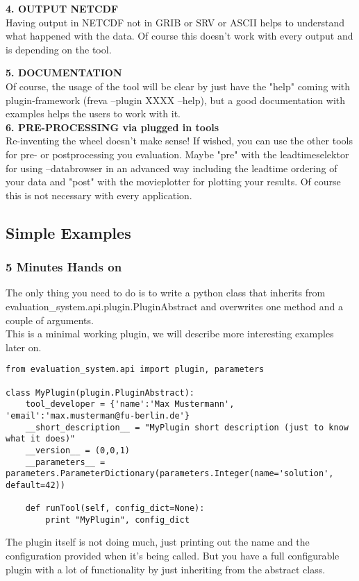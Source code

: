 \documentclass[a4paper,11pt]{ltxdoc}
\begin{document}
\textbf{4. OUTPUT NETCDF}\\
Having output in NETCDF not in GRIB or SRV or ASCII helps to understand what happened with the data. Of course this doesn't work with every output and is depending on the tool.

\textbf{5. DOCUMENTATION}\\
Of course, the usage of the tool will be clear by just have the "help" coming with plugin-framework (freva --plugin XXXX --help), but a good documentation with examples helps the users to work with it.\\

\textbf{6. PRE-PROCESSING via plugged in tools}\\
Re-inventing the wheel doesn't make sense! If wished, you can use the other tools for pre- or postprocessing you evaluation. Maybe "pre" with the leadtimeselektor for using --databrowser in an advanced way including the leadtime ordering of your data and "post" with the movieplotter for plotting your results. Of course this is not necessary with every application.
\subsection{Simple Examples}
\subsubsection{5 Minutes Hands on}
The only thing you need to do is to write a python class that inherits from evaluation\_system.api.plugin.PluginAbstract and overwrites one method and a couple of arguments. \\
This is a minimal working plugin, we will describe more interesting examples later on.\\
\begin{lstlisting}
from evaluation_system.api import plugin, parameters

class MyPlugin(plugin.PluginAbstract):
    tool_developer = {'name':'Max Mustermann', 'email':'max.musterman@fu-berlin.de'}
    __short_description__ = "MyPlugin short description (just to know what it does)" 
    __version__ = (0,0,1)
    __parameters__ =  parameters.ParameterDictionary(parameters.Integer(name='solution', default=42))

    def runTool(self, config_dict=None):
        print "MyPlugin", config_dict
\end{lstlisting}
The plugin itself is not doing much, just printing out the name and the configuration provided when it's being called.
But you have a full configurable plugin with a lot of functionality by just inheriting from the abstract class.\\
\end{document}
